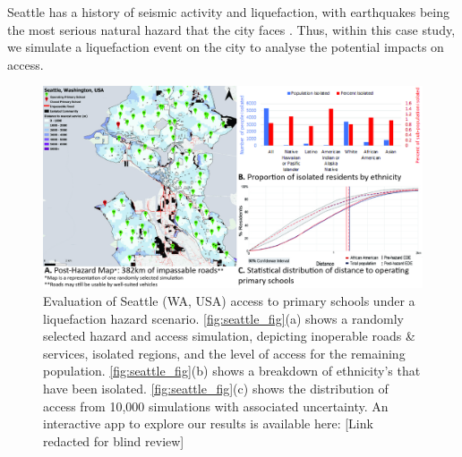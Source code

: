 \documentclass[review,3p,times,onecolumn,sort&compress,12pt]{elsarticle}
\let \cite \parencite
\begin{document}
Seattle has a history of seismic activity and liquefaction, with earthquakes being the most serious natural hazard that the city faces \cite{Seattle_Office_of_Emergency_Management2014-vt}.
Thus, within this case study, we simulate a liquefaction event on the city to analyse the potential impacts on access.

\begin{figure}[h]
    \includegraphics[width=1\linewidth]{report/fig/wa_fig.jpg}
    \caption{Evaluation of Seattle (WA, USA) access to primary schools under a liquefaction hazard scenario. \autoref{fig:seattle_fig}(a) shows a randomly selected hazard and access simulation, depicting inoperable roads \& services, isolated regions, and the level of access for the remaining population. \autoref{fig:seattle_fig}(b) shows a breakdown of ethnicity's that have been isolated. \autoref{fig:seattle_fig}(c) shows the distribution of access from 10,000 simulations with associated uncertainty. An interactive app to explore our results is available here: [Link redacted for blind review]}
    \label{fig:seattle_fig}
\end{figure}
\end{document}
